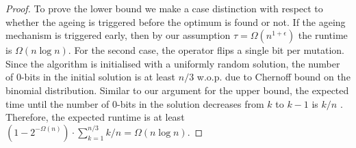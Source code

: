 \begin{proof}
		To prove the lower bound we make a case distinction with respect to whether the ageing is triggered before the optimum is found or not. If the ageing mechanism is triggered early, then by our assumption $\tau=\Omega(n^{1+\epsilon})$ the runtime is $\Omega(n \log n)$. For the second case, the operator flips a single bit per mutation. Since the algorithm is initialised with a uniformly random solution, the number of $0$-bits in the initial solution is at least $n/3$ w.o.p. due to Chernoff bound on the binomial distribution. Similar to our argument for the upper bound, the expected time until the number of $0$-bits in the solution decreases from $k$ to $k-1$ is $k/n$ . Therefore, the expected runtime is  at least $(1-2^{-\Omega(n)}) \cdot \sum_{k=1}^{n/3} k/n = \Omega(n \log n)$. 
	\end{proof}
